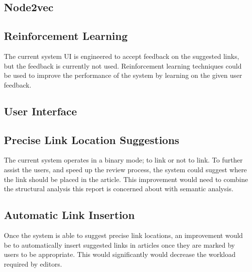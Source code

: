 \subsection{Node2vec}

\subsection{Reinforcement Learning}
The current system UI is engineered to accept feedback on the suggested links, but the feedback is currently not used. Reinforcement learning techniques could be used to improve the performance of the system by learning on the given user feedback.

\subsection{User Interface}

\subsection{Precise Link Location Suggestions}
The current system operates in a binary mode; to link or not to link. To further assist the users, and speed up the review process, the system could suggest where the link should be placed in the article. This improvement would need to combine the structural analysis this report is concerned about with semantic analysis.

\subsection{Automatic Link Insertion}
Once the system is able to suggest precise link locations, an improvement would be to automatically insert suggested links in articles once they are marked by users to be appropriate. This would significantly would decrease the workload required by editors.
